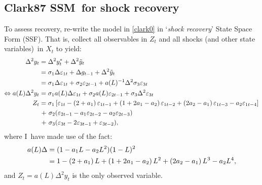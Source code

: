 \documentclass[a4paper,12pt]{article}
\begin{document}
\subsection{Clark87 SSM\ for shock recovery}

To assess recovery, re-write the model in \ref{clark0} in `\emph{shock
recovery}' State Space Form (SSF). That is, collect all observables in $Z_{t}
$ and all shocks (and other state variables)\ in $X_{t}$ to yield:%
\begin{align}
\Delta ^{2}y_{t}& =\Delta ^{2}y_{t}^{\ast }+\Delta ^{2}\tilde{y}_{t}  \notag
\label{Z} \\
& =\sigma _{1}\Delta \varepsilon _{1t}+\Delta g_{t-1}+\Delta ^{2}\tilde{y}%
_{t}  \notag \\
& =\sigma _{1}\Delta \varepsilon _{1t}+\sigma _{2}\varepsilon
_{2t-1}+a(L)^{-1}\Delta ^{2}\sigma _{3}\varepsilon _{3t}  \notag \\
\Leftrightarrow a(L)\Delta ^{2}y_{t}& =\sigma _{1}a(L)\Delta \varepsilon
_{1t}+\sigma _{2}a(L)\varepsilon _{2t-1}+\sigma _{3}\Delta ^{2}\varepsilon
_{3t}  \notag \\
Z_{t}& =\sigma _{1}\left[ \varepsilon _{1t}-\left( 2+a_{1}\right)
\varepsilon _{1t-1}+\left( 1+2a_{1}-a_{2}\right) \varepsilon _{1t-2}+\left(
2a_{2}-a_{1}\right) \varepsilon _{1t-3}-a_{2}\varepsilon _{1t-4}\right]  
\notag \\
& \hspace{1pt}+\hspace{1pt}\sigma _{2}(\varepsilon _{2t-1}-a_{1}\varepsilon
_{2t-2}-a_{2}\varepsilon _{2t-3}) \\
& \hspace{1pt}+\hspace{1pt}\sigma _{3}(\varepsilon _{3t}-2\varepsilon
_{3t-1}+\varepsilon _{3t-2}),  \notag
\end{align}%
where I\ have made use of the fact: 
\begin{align}
a(L)\Delta & =(1-a_{1}L-a_{2}L^{2})(1-L)^{2}  \notag \\
& =1-\left( 2+a_{1}\right) L+\left( 1+2a_{1}-a_{2}\right) L^{2}+\left(
2a_{2}-a_{1}\right) L^{3}-a_{2}L^{4},  \label{expaL}
\end{align}%
and $Z_{t}=a(L)\Delta ^{2}y_{t}$ is the only observed variable.
\end{document}
